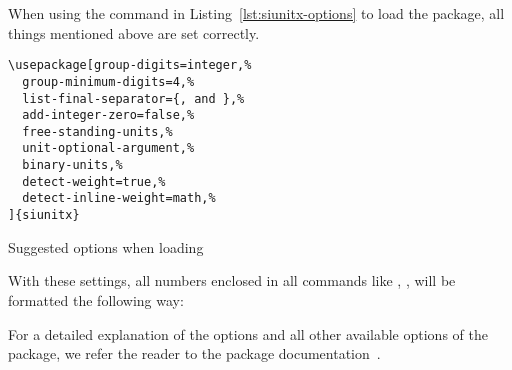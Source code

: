 When using the command in Listing~\ref{lst:siunitx-options} to load the package,
all things mentioned above are set correctly.

\begin{listing}[ht]
\begin{verbatim}
\usepackage[group-digits=integer,%
  group-minimum-digits=4,%
  list-final-separator={, and },%
  add-integer-zero=false,%
  free-standing-units,%
  unit-optional-argument,%
  binary-units,%
  detect-weight=true,%
  detect-inline-weight=math,%
]{siunitx}
\end{verbatim}
\caption{Suggested options when loading }
\label{lst:siunitx-options}
\end{listing}

With these settings, all numbers enclosed in all  commands
like \texttt{\num{}}, \texttt{\numlist{}},
\texttt{\SI{}{}} will be formatted the
following way:

For a detailed explanation of the options and all other available options of the
 package, we refer the reader to the package
documentation~\cite{Wright2016}.
